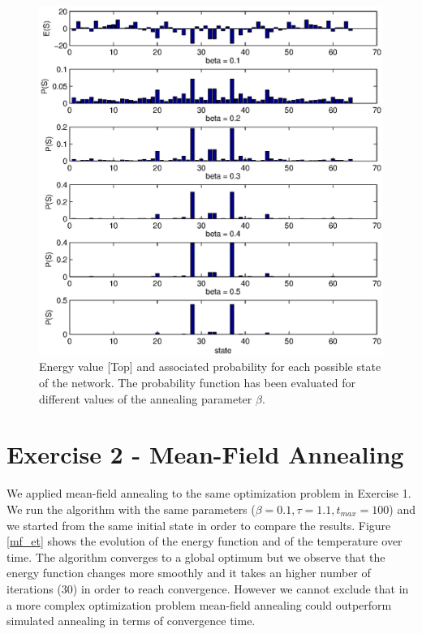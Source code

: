 \documentclass[a4paper,english]{article}
\begin{document}
\begin{figure}[h!]
\centering
\includegraphics[scale = 1]{ex1_annealing_bar.eps}
\caption{Energy value [Top] and associated probability for each possible state of the network. The probability function has been evaluated for different values of the annealing parameter $\beta$.}
\label{bar}
\end{figure}

\clearpage
\section*{Exercise 2 - Mean-Field Annealing}
We applied mean-field annealing to the same optimization problem in Exercise 1. We run the algorithm with the same parameters ($\beta = 0.1, \tau = 1.1, t_{max} = 100$) and we started from the same initial state in order to compare the results. Figure \ref{mf_et} shows the evolution of the energy function and of the temperature over time. The algorithm converges to a global optimum but  we observe that the energy function changes more smoothly and it takes an higher number of iterations (30) in order to reach convergence. However we cannot exclude that in a more complex optimization problem mean-field annealing could outperform simulated annealing in terms of convergence time. 
\end{document}
